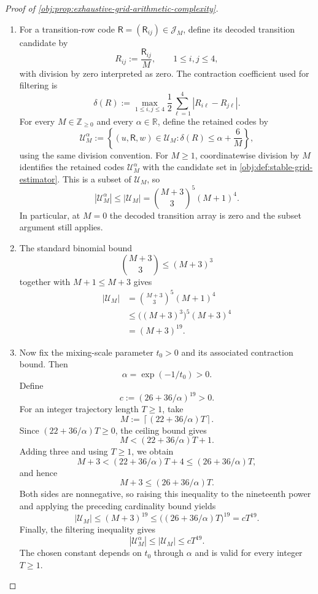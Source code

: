 \begin{proof}[Proof of \cref{obj:prop:exhaustive-grid-arithmetic-complexity}]
\begin{enumerate}
\item For a transition-row code
\(\mathsf R=(\mathsf R_{ij})\in\mathcal J_M\), define its decoded transition candidate by
\[
R_{ij}:=\frac{\mathsf R_{ij}}{M},
\qquad 1\le i,j\le4,
\]
with division by zero interpreted as zero. The contraction coefficient used for filtering is
\[
\delta(R)
:=
\max_{1\le i,j\le4}
\frac12\sum_{\ell=1}^{4}|R_{i\ell}-R_{j\ell}|.
\]
For every \(M\in\mathbb Z_{\ge0}\) and every \(\alpha\in\mathbb R\), define the retained codes by
\[
\mathcal U_M^\alpha
:=
\left\{
(u,\mathsf R,w)\in\mathcal U_M:
\delta(R)\le\alpha+\frac6M
\right\},
\]
using the same division convention. For \(M\ge1\), coordinatewise division by \(M\) identifies the retained codes \(\mathcal U_M^\alpha\) with the candidate set in \cref{obj:def:stable-grid-estimator}. This is a subset of \(\mathcal U_M\), so
\[
|\mathcal U_M^\alpha|
\le
|\mathcal U_M|
=
\binom{M+3}{3}^{5}(M+1)^4.
\]
In particular, at \(M=0\) the decoded transition array is zero and the subset argument still applies.

\item The standard binomial bound
\[
\binom{M+3}{3}\le(M+3)^3
\]
together with \(M+1\le M+3\) gives
\[
\begin{aligned}
|\mathcal U_M|
&=\binom{M+3}{3}^{5}(M+1)^4\\
&\le \bigl((M+3)^3\bigr)^5(M+3)^4\\
&=(M+3)^{19}.
\end{aligned}
\]

\item Now fix the mixing-scale parameter \(t_0>0\) and its associated contraction bound. Then
\[
\alpha=\exp(-1/t_0)>0.
\]
Define
\[
c:=(26+36/\alpha)^{19}>0.
\]
For an integer trajectory length \(T\ge1\), take
\[
M:=\left\lceil(22+36/\alpha)T\right\rceil.
\]
Since \((22+36/\alpha)T\ge0\), the ceiling bound gives
\[
M<(22+36/\alpha)T+1.
\]
Adding three and using \(T\ge1\), we obtain
\[
M+3
<
(22+36/\alpha)T+4
\le
(26+36/\alpha)T,
\]
and hence
\[
M+3\le(26+36/\alpha)T.
\]
Both sides are nonnegative, so raising this inequality to the nineteenth power and applying the preceding cardinality bound yields
\[
|\mathcal U_M|
\le
(M+3)^{19}
\le
\bigl((26+36/\alpha)T\bigr)^{19}
=
cT^{19}.
\]
Finally, the filtering inequality gives
\[
|\mathcal U_M^\alpha|
\le
|\mathcal U_M|
\le
cT^{19}.
\]
The chosen constant depends on \(t_0\) through \(\alpha\) and is valid for every integer \(T\ge1\).
\end{enumerate}
\end{proof}
